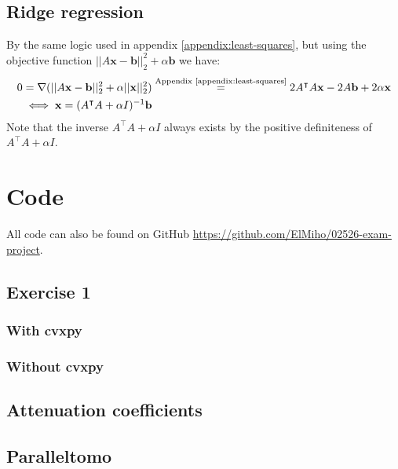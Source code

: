 \documentclass{article}
\begin{document}
\subsection{Ridge regression}\label{appendix:ridge-time}
By the same logic used in appendix \ref{appendix:least-squares}, but using the objective function $||A\mathbf{x} - \mathbf{b}||_2^2 + \alpha \mathbf{b}$ we have:
\begin{align}
    0 &= \nabla (||A\mathbf{x} - \mathbf{b}||_2^{2} + \alpha ||\mathbf{x}||_2^{2}) \stackrel{\textrm{Appendix \ref{appendix:least-squares}}}{=} 2A^\intercal A \mathbf{x} - 2A\mathbf{b} + 2\alpha \mathbf{x} \\
    &\iff \mathbf{x} = (A^\intercal A + \alpha I)^{-1} \mathbf{b}
\end{align}
Note that the inverse $A^\intercal A + \alpha I$ always exists by the positive definiteness of $A^\intercal A + \alpha I$.


\section{Code}
All code can also be found on GitHub \url{https://github.com/ElMiho/02526-exam-project}. 

\subsection{Exercise 1}
\subsubsection{With cvxpy}\label{appendix:exercise-1-cvxpy}


\subsubsection{Without cvxpy}\label{appendix:exercise-1}


\subsection{Attenuation coefficients}\label{appendix:attenuation-coefficients}


\subsection{Paralleltomo}\label{appendix:paralleltomo}

\end{document}
